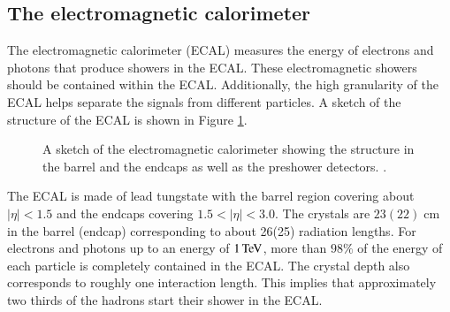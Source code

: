 \subsection{The electromagnetic calorimeter}

The electromagnetic calorimeter (ECAL)\cite{Bayatian:922757} measures the energy of electrons and photons that produce showers in the ECAL.
These electromagnetic showers should be contained within the ECAL. Additionally, the high granularity of the ECAL helps separate the signals from different particles.
A sketch of the structure of the ECAL is shown in Figure \ref{fig:det_ECAL}.

\begin{figure}[htbp!]
  \begin{center}

\caption{A sketch of the electromagnetic calorimeter showing the structure in the barrel and the endcaps as well as the preshower detectors. \cite{Chatrchyan:2009qm}.
  \label{fig:det_ECAL}}
  \end{center}
\end{figure}

The ECAL is made of lead tungstate with the barrel region covering about $|\eta| < 1.5$ and the endcaps covering $1.5 < |\eta|<3.0$. The crystals are $23 (22)  \;\si{\centi \meter}$ in the barrel (endcap) corresponding to about 26(25) radiation lengths.
For electrons and photons up to an energy of $1 \,\text{Te\hspace{-.08em}V}$, more than $98  \%$ of the energy of each particle is completely contained in the ECAL.
The crystal depth also corresponds to roughly one interaction length. This implies that approximately two thirds of the hadrons start their shower in the ECAL.

